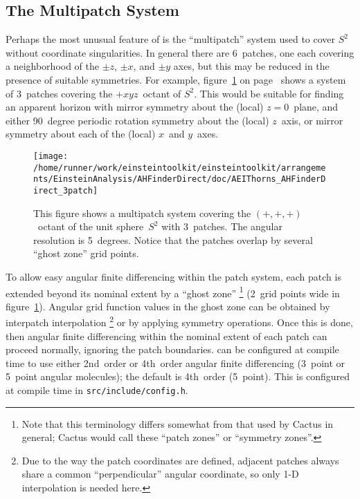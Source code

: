 
\subsection{The Multipatch System}
\label{AHFinderDirect/sect-multipatch-system}

Perhaps the most unusual feature of  is the
``multipatch'' system used to cover $S^2$ without coordinate singularities.
In general there are 6~patches, one each covering a neighborhood of
the $\pm z$, $\pm x$, and $\pm y$ axes, but this may be reduced in
the presence of suitable symmetries.  For example,
figure~\ref{AHFinderDirect/fig-3patch}
on page~\pageref{AHFinderDirect/fig-3patch} shows a system
of 3~patches covering the $+xyz$~octant of $S^2$.  This would be
suitable for finding an apparent horizon with mirror symmetry about
the (local) $z=0$~plane, and either 90~degree periodic rotation symmetry
about the (local) $z$~axis, or mirror symmetry about each of the (local)
$x$~and $y$~axes.

\begin{figure}[htbp]
\begin{center}
\texttt{[image: /home/runner/work/einsteintoolkit/einsteintoolkit/arrangements/EinsteinAnalysis/AHFinderDirect/doc/AEIThorns\_AHFinderDirect\_3patch]}
\end{center}
\caption[Illustration of the Multipatch System]
	{
	This figure shows a multipatch system covering the
	$(+,+,+)$~octant of the unit sphere~$S^2$ with 3~patches.
	The angular resolution is 5~degrees.  Notice that the
	patches overlap by several ``ghost zone'' grid points.
	}
\label{AHFinderDirect/fig-3patch}
\end{figure}

To allow easy angular finite differencing within the patch system,
each patch is extended beyond its nominal extent by a ``ghost zone''%
\footnote{%
	 Note that this terminology differs somewhat
	 from that used by Cactus in general; Cactus
	 would call these ``patch zones'' or ``symmetry
	 zones''.
	 }%
{} (2~grid points wide in figure~\ref{AHFinderDirect/fig-3patch}).
Angular grid function values in the ghost zone can be obtained by
interpatch interpolation%
\footnote{%
	 Due to the way the patch coordinates are defined,
	 adjacent patches always share a common ``perpendicular''
	 angular coordinate, so only 1-D interpolation
	 is needed here.
	 }%
{} or by applying symmetry operations.  Once this is done, then angular
finite differencing within the nominal extent of each patch can proceed
normally, ignoring the patch boundaries.   can
be configured at compile time to use either 2nd~order or 4th~order
angular finite differencing (3~point or 5~point angular molecules);
the default is 4th~order (5~point).  This is configured at compile time
in \verb|src/include/config.h|.

